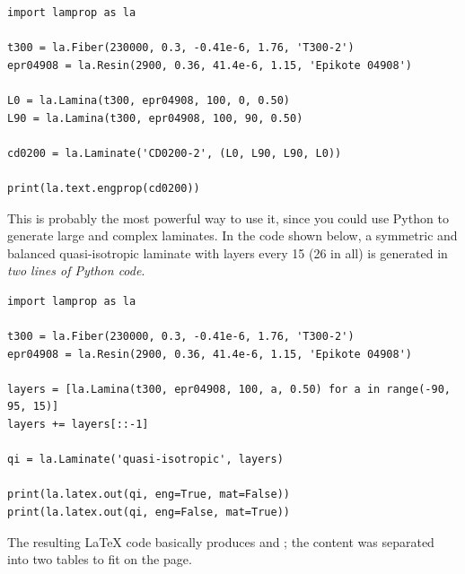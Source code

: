 \documentclass[a4paper,landscape,oneside,11pt,twocolumn]{memoir}
\begin{document}
\begin{lstlisting}
import lamprop as la

t300 = la.Fiber(230000, 0.3, -0.41e-6, 1.76, 'T300-2')
epr04908 = la.Resin(2900, 0.36, 41.4e-6, 1.15, 'Epikote 04908')

L0 = la.Lamina(t300, epr04908, 100, 0, 0.50)
L90 = la.Lamina(t300, epr04908, 100, 90, 0.50)

cd0200 = la.Laminate('CD0200-2', (L0, L90, L90, L0))

print(la.text.engprop(cd0200))
\end{lstlisting}

This is probably the most powerful way to use it, since you could use Python
to generate large and complex laminates. In the code shown below, a symmetric
and balanced quasi-isotropic laminate with layers every 15\textdegree{} (26 in
all) is generated in \emph{two lines of Python code}.

\begin{lstlisting}
import lamprop as la

t300 = la.Fiber(230000, 0.3, -0.41e-6, 1.76, 'T300-2')
epr04908 = la.Resin(2900, 0.36, 41.4e-6, 1.15, 'Epikote 04908')

layers = [la.Lamina(t300, epr04908, 100, a, 0.50) for a in range(-90, 95, 15)]
layers += layers[::-1]

qi = la.Laminate('quasi-isotropic', layers)

print(la.latex.out(qi, eng=True, mat=False))
print(la.latex.out(qi, eng=False, mat=True))
\end{lstlisting}

The resulting \LaTeX{} code basically produces  and
; the content was separated into two tables to
fit on the page.
\end{document}
